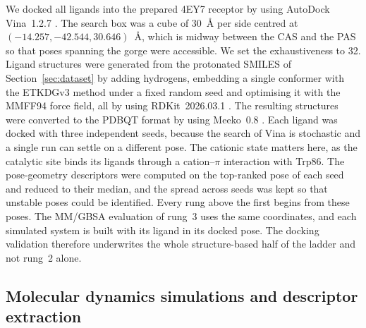 We docked all ligands into the prepared 4EY7 receptor by using AutoDock Vina~1.2.7
\citep{vina_orig,vina}. The search box was a cube of \SI{30}{\angstrom} per side
centred at $(-14.257, -42.544, 30.646)$~\AA{}, which is midway between the CAS and the
PAS so that poses spanning the gorge were accessible. We set the exhaustiveness to 32.
Ligand structures were generated from the protonated SMILES of
Section~\ref{sec:dataset} by adding hydrogens, embedding a single conformer with the
ETKDGv3 method under a fixed random seed and optimising it with the MMFF94 force field,
all by using RDKit~2026.03.1 \citep{rdkit}. The resulting structures were converted to
the PDBQT format by using Meeko~0.8 \citep{meeko}. Each ligand was docked with three
independent seeds, because the search of Vina is stochastic and a single run can settle
on a different pose. The cationic state matters here, as the catalytic site binds its
ligands through a cation--$\pi$ interaction with Trp86. The pose-geometry descriptors
were computed on the top-ranked pose of each seed and reduced to their median, and the
spread across seeds was kept so that unstable poses could be identified. Every rung
above the first begins from these poses. The MM/GBSA evaluation of rung~3 uses the same
coordinates, and each simulated system is built with its ligand in its docked pose. The
docking validation therefore underwrites the whole structure-based half of the ladder
and not rung~2 alone.

\subsection{Molecular dynamics simulations and descriptor extraction}\label{sec:md}

